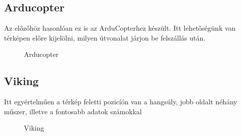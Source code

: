 \documentclass[12pt]{article}
\begin{document}
\subsection{Arducopter}
Az el\H{o}z\H{o}höz hasonlóan ez is az ArduCopterhez készült. Itt lehet\H{o}ségünk van térképen el\H{o}re kijelölni, milyen útvonalat járjon be felszállás után.


\begin{figure}[H]
	\centering
	\caption{Arducopter}
	\label{fig:hk}
\end{figure}


\subsection{Viking}
\cite{bib:viking} Itt egyértelm\H{u}en a térkép feletti pozicíón van a hangsúly, jobb oldalt néhány m\H{u}szer, illetve a fontosabb adatok számokkal


\begin{figure}[H]
	\centering
	\caption{Viking}
	\label{fig:viking}
\end{figure}
\end{document}

